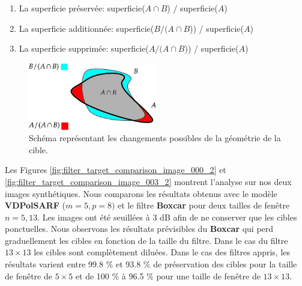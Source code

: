 \begin{enumerate}
    \item La superficie préservée: superficie($A \cap B$) / superficie($A$)
    \item La superficie additionnée: superficie($B / (A \cap B$)) / superficie($A$)
    \item La superficie supprimée: superficie($A / (A \cap B$)) / superficie($A$)
\end{enumerate}

\begin{figure}[!htbp] 
\includegraphics[width=0.5\textwidth]{figures/Chap4/results/targets.jpg}
 \centering
  \caption{
  \small{Schéma représentant les changements possibles de la géométrie de la cible.    }}
  \label{fig:filter_target_surface}
\end{figure}

Les Figures \ref{fig:filter_target_comparison_image_000_2} et \ref{fig:filter_target_comparison_image_003_2} montrent l'analyse sur nos deux images synthétiques.  Nous comparons les résultats obtenus avec le modèle \textbf{VDPolSARF} ($m=5, p=8)$ et le filtre \textbf{Boxcar} pour deux tailles de fenêtre $n=5, 13$. Les images ont été seuillées à 3 dB afin de ne conserver que les cibles ponctuelles. Nous observons les résultats prévisibles du \textbf{Boxcar} qui perd graduellement les cibles en fonction de la taille du filtre.  Dans le cas du filtre $13 \times 13$ les cibles sont complètement diluées. Dans le cas des filtres appris, les résultats varient entre 99.8 \% et  93.8 \% de préservation des cibles pour la taille de fenêtre de $5 \times 5$ et de 100 \% à 96.5 \% pour une taille de fenêtre de $13 \times 13$.



